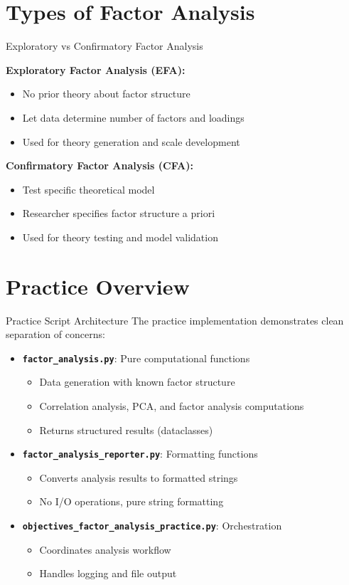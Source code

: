 \documentclass[aspectratio=169]{beamer}
\begin{document}
\section{Types of Factor Analysis}
\begin{frame}{Exploratory vs Confirmatory Factor Analysis}
  
  \textbf{Exploratory Factor Analysis (EFA):}
  \begin{itemize}
    \item No prior theory about factor structure
    \item Let data determine number of factors and loadings
    \item Used for theory generation and scale development
  \end{itemize}
  
  \vspace{0.5cm}
  
  \textbf{Confirmatory Factor Analysis (CFA):}
  \begin{itemize}
    \item Test specific theoretical model
    \item Researcher specifies factor structure a priori
    \item Used for theory testing and model validation
  \end{itemize}
\end{frame}

\section{Practice Overview}
\begin{frame}{Practice Script Architecture}
  The practice implementation demonstrates clean separation of concerns:
  \begin{itemize}
    \item \textbf{\texttt{factor\_analysis.py}}: Pure computational functions
    \begin{itemize}
      \item Data generation with known factor structure
      \item Correlation analysis, PCA, and factor analysis computations
      \item Returns structured results (dataclasses)
    \end{itemize}
    \item \textbf{\texttt{factor\_analysis\_reporter.py}}: Formatting functions  
    \begin{itemize}
      \item Converts analysis results to formatted strings
      \item No I/O operations, pure string formatting
    \end{itemize}
    \item \textbf{\texttt{objectives\_factor\_analysis\_practice.py}}: Orchestration
    \begin{itemize}
      \item Coordinates analysis workflow
      \item Handles logging and file output
    \end{itemize}
  \end{itemize}
\end{frame}
\end{document}
